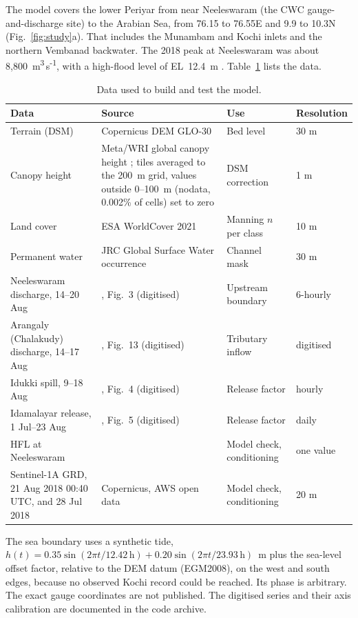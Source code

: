 \documentclass[preprint,12pt,authoryear]{elsarticle}
\newcommand{\cumecs}{m\textsuperscript{3}\,s\textsuperscript{-1}}
\begin{document}
The model covers the lower Periyar from near Neeleswaram (the CWC gauge-and-discharge site) to the Arabian Sea, from 76.15 to 76.55\textdegree E and 9.9 to 10.3\textdegree N (Fig.~\ref{fig:study}a). That includes the Munambam and Kochi inlets and the northern Vembanad backwater. The 2018 peak at Neeleswaram was about 8,800~\cumecs, with a high-flood level of EL~12.4~m \citep{cwc2018}. Table~\ref{tab:data} lists the data.

\begin{table}[htbp]
\centering
\caption{Data used to build and test the model.}
\label{tab:data}
\small
\begin{tabularx}{\textwidth}{@{}>{\raggedright\arraybackslash}X>{\raggedright\arraybackslash}X>{\raggedright\arraybackslash}p{2.8cm}l@{}}
\toprule
Data & Source & Use & Resolution \\
\midrule
Terrain (DSM) & Copernicus DEM GLO-30 \citep{esa2021} & Bed level & 30 m \\
Canopy height & Meta/WRI global canopy height \citep{tolan2024}; tiles averaged to the 200~m grid, values outside 0--100~m (nodata, 0.002\% of cells) set to zero & DSM correction & 1 m \\
Land cover & ESA WorldCover 2021 \citep{zanaga2022} & Manning $n$ per class & 10 m \\
Permanent water & JRC Global Surface Water occurrence \citep{pekel2016} & Channel mask & 30 m \\
Neeleswaram discharge, 14--20 Aug & \citet{cwc2018}, Fig.~3 (digitised) & Upstream boundary & 6-hourly \\
Arangaly (Chalakudy) discharge, 14--17 Aug & \citet{cwc2018}, Fig.~13 (digitised) & Tributary inflow & digitised \\
Idukki spill, 9--18 Aug & \citet{cwc2018}, Fig.~4 (digitised) & Release factor & hourly \\
Idamalayar release, 1 Jul--23 Aug & \citet{cwc2018}, Fig.~5 (digitised) & Release factor & daily \\
HFL at Neeleswaram & \citet{cwc2018} & Model check, conditioning & one value \\
Sentinel-1A GRD, 21 Aug 2018 00:40 UTC, and 28 Jul 2018 & Copernicus, AWS open data & Model check, conditioning & 20 m \\
\bottomrule
\end{tabularx}
\end{table}

The sea boundary uses a synthetic tide, $h(t) = 0.35\sin(2\pi t/12.42\,\mathrm{h}) + 0.20\sin(2\pi t/23.93\,\mathrm{h})$~m plus the sea-level offset factor, relative to the DEM datum (EGM2008), on the west and south edges, because no observed Kochi record could be reached. Its phase is arbitrary. The exact gauge coordinates are not published. The digitised series and their axis calibration are documented in the code archive.
\end{document}
